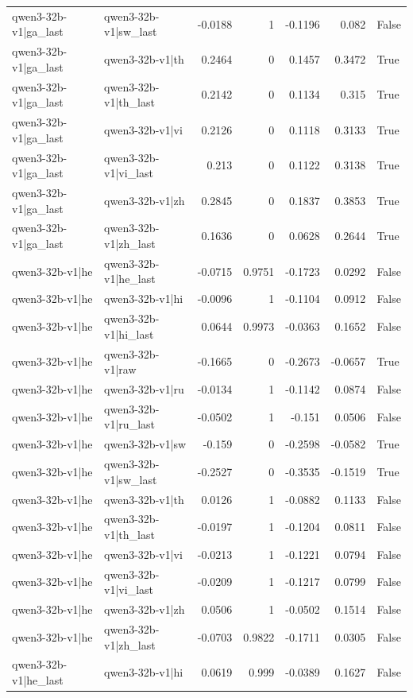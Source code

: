 \begin{table}
\begin{tabular}{l l r r r r l}
qwen3-32b-v1|ga_last & qwen3-32b-v1|sw_last & -0.0188 & 1 & -0.1196 & 0.082 & False \\
qwen3-32b-v1|ga_last & qwen3-32b-v1|th & 0.2464 & 0 & 0.1457 & 0.3472 & True \\
qwen3-32b-v1|ga_last & qwen3-32b-v1|th_last & 0.2142 & 0 & 0.1134 & 0.315 & True \\
qwen3-32b-v1|ga_last & qwen3-32b-v1|vi & 0.2126 & 0 & 0.1118 & 0.3133 & True \\
qwen3-32b-v1|ga_last & qwen3-32b-v1|vi_last & 0.213 & 0 & 0.1122 & 0.3138 & True \\
qwen3-32b-v1|ga_last & qwen3-32b-v1|zh & 0.2845 & 0 & 0.1837 & 0.3853 & True \\
qwen3-32b-v1|ga_last & qwen3-32b-v1|zh_last & 0.1636 & 0 & 0.0628 & 0.2644 & True \\
qwen3-32b-v1|he & qwen3-32b-v1|he_last & -0.0715 & 0.9751 & -0.1723 & 0.0292 & False \\
qwen3-32b-v1|he & qwen3-32b-v1|hi & -0.0096 & 1 & -0.1104 & 0.0912 & False \\
qwen3-32b-v1|he & qwen3-32b-v1|hi_last & 0.0644 & 0.9973 & -0.0363 & 0.1652 & False \\
qwen3-32b-v1|he & qwen3-32b-v1|raw & -0.1665 & 0 & -0.2673 & -0.0657 & True \\
qwen3-32b-v1|he & qwen3-32b-v1|ru & -0.0134 & 1 & -0.1142 & 0.0874 & False \\
qwen3-32b-v1|he & qwen3-32b-v1|ru_last & -0.0502 & 1 & -0.151 & 0.0506 & False \\
qwen3-32b-v1|he & qwen3-32b-v1|sw & -0.159 & 0 & -0.2598 & -0.0582 & True \\
qwen3-32b-v1|he & qwen3-32b-v1|sw_last & -0.2527 & 0 & -0.3535 & -0.1519 & True \\
qwen3-32b-v1|he & qwen3-32b-v1|th & 0.0126 & 1 & -0.0882 & 0.1133 & False \\
qwen3-32b-v1|he & qwen3-32b-v1|th_last & -0.0197 & 1 & -0.1204 & 0.0811 & False \\
qwen3-32b-v1|he & qwen3-32b-v1|vi & -0.0213 & 1 & -0.1221 & 0.0794 & False \\
qwen3-32b-v1|he & qwen3-32b-v1|vi_last & -0.0209 & 1 & -0.1217 & 0.0799 & False \\
qwen3-32b-v1|he & qwen3-32b-v1|zh & 0.0506 & 1 & -0.0502 & 0.1514 & False \\
qwen3-32b-v1|he & qwen3-32b-v1|zh_last & -0.0703 & 0.9822 & -0.1711 & 0.0305 & False \\
qwen3-32b-v1|he_last & qwen3-32b-v1|hi & 0.0619 & 0.999 & -0.0389 & 0.1627 & False \\

\end{tabular}
\end{table}
